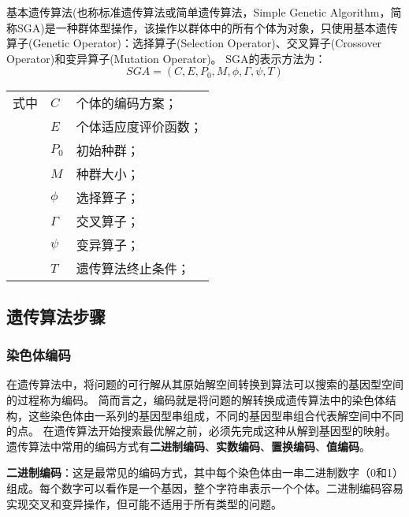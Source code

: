   基本遗传算法(也称标准遗传算法或简单遗传算法，Simple Genetic Algorithm，简称SGA)是一种群体型操作，该操作以群体中的所有个体为对象，只使用基本遗传算子(Genetic Operator)：选择算子(Selection Operator)、交叉算子(Crossover Operator)和变异算子(Mutation Operator)。
  SGA的表示方法为：
  \begin{equation}
    \label{eq:GA}
    SGA = (C, E, P_0, M, \phi, \Gamma, \psi,T)
  \end{equation}
  \begin{flushleft}
    \renewcommand\arraystretch{1.25}
    \begin{tabularx}{\textwidth}{@{}>{\normalsize\rm}l@{\quad}>{\normalsize\rm}l@{——}>{\normalsize\rm}X@{}}
    式中
    
    &  $C$ &个体的编码方案；\\
    &  $E$ &个体适应度评价函数；\\
    &  $P_0$   &初始种群；\\
    &  $M$ & 种群大小；\\
    &  $\phi$ & 选择算子；\\
    &  $\Gamma$ & 交叉算子；\\
    &  $\psi$ & 变异算子；\\
    &  $T$ & 遗传算法终止条件；\\
    \end{tabularx}\vspace{.5ex}%
  \end{flushleft}

    \subsection{遗传算法步骤}
    \subsubsection*{染色体编码}
    在遗传算法中，将问题的可行解从其原始解空间转换到算法可以搜索的基因型空间的过程称为编码。
    简而言之，编码就是将问题的解转换成遗传算法中的染色体结构，这些染色体由一系列的基因型串组成，不同的基因型串组合代表解空间中不同的点。
    在遗传算法开始搜索最优解之前，必须先完成这种从解到基因型的映射。遗传算法中常用的编码方式有\textbf{二进制编码}、\textbf{实数编码}、\textbf{置换编码}、\textbf{值编码}。
    
    
    \textbf{二进制编码}：这是最常见的编码方式，其中每个染色体由一串二进制数字（0和1）组成。每个数字可以看作是一个基因，整个字符串表示一个个体。二进制编码容易实现交叉和变异操作，但可能不适用于所有类型的问题。

